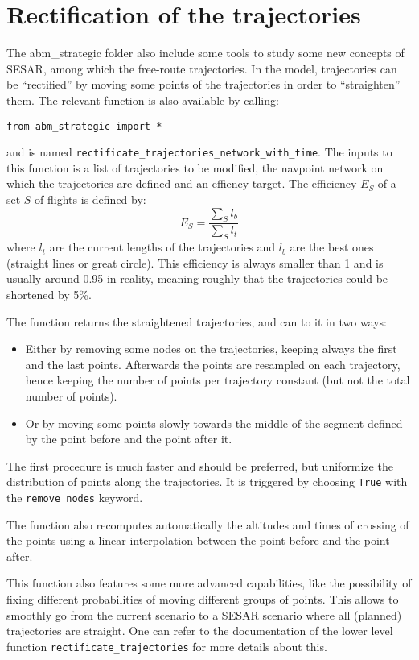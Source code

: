 \documentclass[12pt]{article}
\begin{document}
\section{Rectification of the trajectories}
\label{sec:rectification}

The abm\_strategic folder also include some tools to study some new concepts of SESAR, among which the free-route trajectories. In the model, trajectories can be ``rectified'' by moving some points of the trajectories in order to ``straighten'' them. The relevant function is also available by calling:
\begin{verbatim}
from abm_strategic import *
\end{verbatim}
and is named \verb|rectificate_trajectories_network_with_time|. The inputs to this function is a list of trajectories to be modified, the navpoint network on which the trajectories are defined and an effiency target. The efficiency $E_S$ of a set $S$ of flights is defined by:
$$
E_S = \frac{\sum_S l_b}{\sum_S l_t}
$$
where $l_t$ are the current lengths of the trajectories and $l_b$ are the best ones (straight lines or great circle). This efficiency is always smaller than 1 and is usually around 0.95 in reality, meaning roughly that the trajectories could be shortened by 5\%.

The function returns the straightened trajectories, and can to it in two ways:
\begin{itemize}
\item Either by removing some nodes on the trajectories, keeping always the first and the last points. Afterwards the points are resampled on each trajectory, hence keeping the number of points per trajectory constant (but not the total number of points).
\item Or by moving some points slowly towards the middle of the segment defined by the point before and the point after it.
\end{itemize}
The first procedure is much faster and should be preferred, but uniformize the distribution of points along the trajectories. It is triggered by choosing \verb|True| with the \verb|remove_nodes| keyword.

The function also recomputes automatically the altitudes and times of crossing of the points using a linear interpolation between the point before and the point after.

This function also features some more advanced capabilities, like the possibility of fixing different probabilities of moving different groups of points. This allows to smoothly go from the current scenario to a SESAR scenario where all (planned) trajectories are straight. One can refer to the documentation of the lower level function  \verb|rectificate_trajectories| for more details about this.
\end{document}
